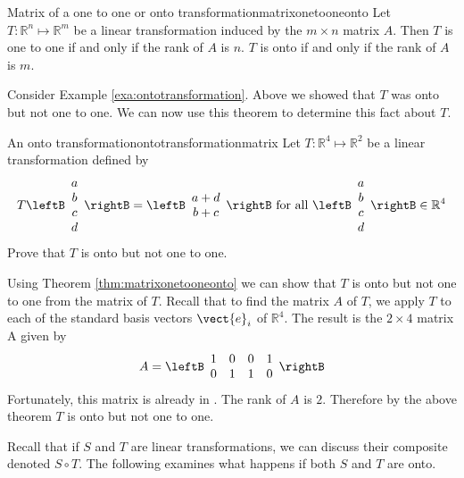 \begin{theorem}{Matrix of a one to one or onto transformation}{matrixonetooneonto}
Let $T: \mathbb{R}^n \mapsto \mathbb{R}^m$ be a linear transformation induced by the $m \times n$ matrix $A$. Then $T$ is one to one if and only if the rank of $A$ is $n$. $T$ is onto if and only if the rank of $A$ is $m$. 
\end{theorem}

Consider Example \ref{exa:ontotransformation}. Above we showed that $T$ was onto but not one to one. We can now use this theorem to determine this fact about $T$. 

\begin{example}{An onto transformation}{ontotransformationmatrix}
Let $T: \mathbb{R}^4 \mapsto \mathbb{R}^2$ be a linear transformation defined by
\[
T \leftB \begin{array}{c}
a \\
b \\
c \\
d
\end{array}
\rightB = 
\leftB \begin{array}{c}
a + d \\
b + c 
\end{array}
\rightB
\mbox{ for all } \leftB \begin{array}{c}
a \\
b \\
c \\
d
\end{array}
\rightB \in \mathbb{R}^4
\]
Prove that $T$ is onto but not one to one.
\end{example}

\begin{solution}
Using Theorem \ref{thm:matrixonetooneonto} we can show that $T$ is onto but not one to one from the matrix of $T$. Recall that to find the matrix $A$ of $T$, we apply $T$ to each of the standard basis vectors $\vect{e}_i$ of $\mathbb{R}^4$. The result is the $2 \times 4$ matrix A given by 
\[
A = \leftB \begin{array}{rrrr}
1 & 0 & 0 & 1 \\
0 & 1 & 1 & 0 
\end{array} \rightB
\]
Fortunately, this matrix is already in {\rref}. The rank of $A$ is $2$. Therefore by the above theorem $T$ is onto but not one to one. 
\end{solution}

Recall that if $S$ and $T$ are linear transformations, we can discuss their composite denoted $S \circ T$. The following examines what happens if both $S$ and $T$ are onto. 

